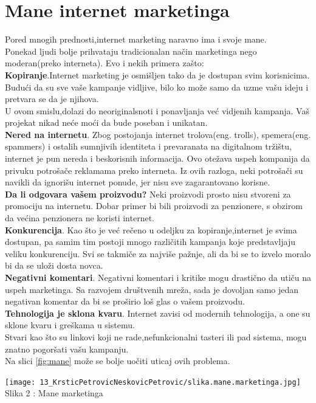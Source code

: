 \documentclass[a4paper]{article}
\begin{document}
{\section{Mane internet marketinga}
\label{sec:mane}
Pored mnogih prednosti,internet marketing naravno ima i svoje mane.
\\Ponekad ljudi bolje prihvataju tradicionalan način marketinga nego moderan(preko interneta). Evo i nekih primera zašto:
\\\textbf{Kopiranje}.Internet marketing je osmišljen tako da je dostupan svim korisnicima. Budući da su sve vaše kampanje vidljive, bilo ko može samo da uzme vašu ideju i pretvara se da je njihova.
\\U ovom smislu,dolazi do neoriginalsnoti i ponavljanja već vidjenih kampanja. Vaš projekat nikad neće moći da bude poseban i unikatan.
\\\textbf{Nered na internetu}.
Zbog postojanja internet trolova(eng. trolls), spemera(eng. spammers) i ostalih sumnjivih identiteta i prevaranata na digitalnom tržištu, internet je pun nereda i beskorisnih informacija. Ovo otežava uspeh kompanija da privuku potrošače reklamama preko interneta. Iz ovih razloga, neki potrošači su navikli da ignorišu internet ponude, jer nisu sve zagarantovano korisne.
\\\textbf{Da li odgovara vašem proizvodu?}
Neki proizvodi prosto nisu stvoreni za promociju na internetu. Dobar primer bi bili proizvodi za penzionere, s obzirom da većina penzionera ne koristi internet.
\\\textbf{Konkurencija}.
Kao što je već rečeno u odeljku za kopiranje,internet je svima dostupan, pa samim tim postoji mnogo različitih kampanja koje predstavljaju veliku konkurenciju. Svi se takmiče za najviše pažnje, ali da bi se to izvelo moralo bi da se uloži dosta novca.
\\\textbf{Negativni komentari}.
Negativni komentari i kritike mogu drastično da utiču na uspeh marketinga. Sa razvojem društvenih mreža, sada je dovoljan samo jedan negativan komentar da bi se proširio loš glas o vašem proizvodu.
\\\textbf{Tehnologija je sklona kvaru}.
 Internet zavisi od modernih tehnologija, a one su sklone kvaru i greškama u sistemu.
\\Stvari kao što su linkovi koji ne rade,nefunkcionalni tasteri ili pad sistema, mogu znatno pogoršati vašu kampanju.
\cite{prednosti i mane}
\\Na slici \ref{fig:mane} može se bolje uočiti uticaj ovih problema.
\begin{center}
    \texttt{[image: 13\_KrsticPetrovicNeskovicPetrovic/slika.mane.marketinga.jpg]}\\
    \large{Slika 2 : Mane marketinga}
\end{center}
\label{fig:mane}
}
\end{document}
